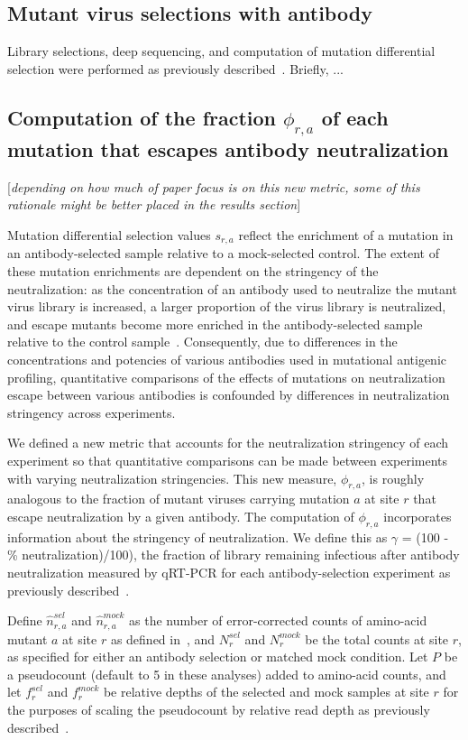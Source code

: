 \documentclass[11pt]{article}
\newcommand{\comment}[1]{{\color{red}[\textsl{#1}]}}
\begin{document}
\subsection*{Mutant virus selections with antibody}
Library selections, deep sequencing, and computation of mutation differential selection were performed as previously described~\cite{doud2017complete}. Briefly, ...

\subsection*{Computation of the fraction $\phi_{r,a}$ of each mutation that escapes antibody neutralization}
\comment{depending on how much of paper focus is on this new metric, some of this rationale might be better placed in the results section}

Mutation differential selection values $s_{r,a}$ reflect the enrichment of a mutation in an antibody-selected sample relative to a mock-selected control. 
The extent of these mutation enrichments are dependent on the stringency of the neutralization: as the concentration of an antibody used to neutralize the mutant virus library is increased, a larger proportion of the virus library is neutralized, and escape mutants become more enriched in the antibody-selected sample relative to the control sample~\cite{doud2017complete}.
Consequently, due to differences in the concentrations and potencies of various antibodies used in mutational antigenic profiling, quantitative comparisons of the effects of mutations on neutralization escape between various antibodies is confounded by differences in neutralization stringency across experiments.

We defined a new metric that accounts for the neutralization stringency of each experiment so that quantitative comparisons can be made between experiments with varying neutralization stringencies.
This new measure, $\phi_{r,a}$, is roughly analogous to the fraction of mutant viruses carrying mutation $a$ at site $r$ that escape neutralization by a given antibody.
The computation of $\phi_{r,a}$ incorporates information about the stringency of neutralization. 
We define this as  $\gamma$ = (100 - \% neutralization)/100), the fraction of library remaining infectious after antibody neutralization measured by qRT-PCR for each antibody-selection experiment as previously described~\cite{doud2017complete}.

Define $\hat{n}_{r,a}^{sel}$ and $\hat{n}_{r,a}^{mock}$ as the number of error-corrected counts of amino-acid mutant $a$ at site $r$ as defined in~\cite{doud2017complete}, and $N_r^{sel}$ and $N_r^{mock}$ be the total counts at site $r$, as specified for either an antibody selection or matched mock condition.
Let $P$ be a pseudocount (default to 5 in these analyses) added to amino-acid counts, and let $f_{r}^{sel}$ and $f_{r}^{mock}$ be relative depths of the selected and mock samples at site $r$ for the purposes of scaling the pseudocount by relative read depth as previously described~\cite{doud2017complete}.
\end{document}
